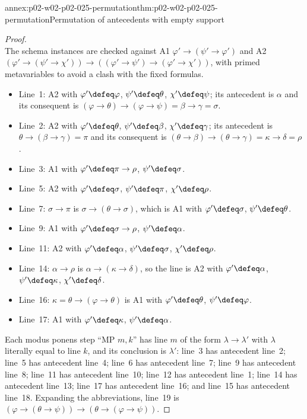 \begin{annexitem}{annex:p02-w02-p02-025-permutation}{thm:p02-w02-p02-025-permutation}{Permutation of antecedents with empty support}
\begin{proof}
\[\]
The schema instances are checked against A1
\(\varphi'\to(\psi'\to\varphi')\) and A2
\((\varphi'\to(\psi'\to\chi'))\to((\varphi'\to\psi')\to(\varphi'\to\chi'))\),
with primed metavariables to avoid a clash with the fixed formulas.
\begin{itemize}
  \item Line~1: A2 with \(\varphi'\defeq\varphi\), \(\psi'\defeq\theta\),
        \(\chi'\defeq\psi\); its antecedent is \(\alpha\) and its consequent
        is \((\varphi\to\theta)\to(\varphi\to\psi)=\beta\to\gamma=\sigma\).
  \item Line~2: A2 with \(\varphi'\defeq\theta\), \(\psi'\defeq\beta\),
        \(\chi'\defeq\gamma\); its antecedent is
        \(\theta\to(\beta\to\gamma)=\pi\) and its consequent is
        \((\theta\to\beta)\to(\theta\to\gamma)=\kappa\to\delta=\rho\).
  \item Line~3: A1 with \(\varphi'\defeq\pi\to\rho\),
        \(\psi'\defeq\sigma\).
  \item Line~5: A2 with \(\varphi'\defeq\sigma\), \(\psi'\defeq\pi\),
        \(\chi'\defeq\rho\).
  \item Line~7: \(\sigma\to\pi\) is \(\sigma\to(\theta\to\sigma)\), which is
        A1 with \(\varphi'\defeq\sigma\), \(\psi'\defeq\theta\).
  \item Line~9: A1 with \(\varphi'\defeq\sigma\to\rho\),
        \(\psi'\defeq\alpha\).
  \item Line~11: A2 with \(\varphi'\defeq\alpha\), \(\psi'\defeq\sigma\),
        \(\chi'\defeq\rho\).
  \item Line~14: \(\alpha\to\rho\) is \(\alpha\to(\kappa\to\delta)\), so the
        line is A2 with \(\varphi'\defeq\alpha\), \(\psi'\defeq\kappa\),
        \(\chi'\defeq\delta\).
  \item Line~16: \(\kappa=\theta\to(\varphi\to\theta)\) is A1 with
        \(\varphi'\defeq\theta\), \(\psi'\defeq\varphi\).
  \item Line~17: A1 with \(\varphi'\defeq\kappa\), \(\psi'\defeq\alpha\).
\end{itemize}
Each modus ponens step ``MP \(m,k\)'' has line \(m\) of the form
\(\lambda\to\lambda'\) with \(\lambda\) literally equal to line \(k\), and its
conclusion is \(\lambda'\): line~3 has antecedent line~2; line~5 has
antecedent line~4; line~6 has antecedent line~7; line~9 has antecedent
line~8; line~11 has antecedent line~10; line~12 has antecedent line~1;
line~14 has antecedent line~13; line~17 has antecedent line~16; and line~15
has antecedent line~18.  Expanding the abbreviations, line~19 is
\((\varphi\to(\theta\to\psi))\to(\theta\to(\varphi\to\psi))\).


\end{proof}
\end{annexitem}
